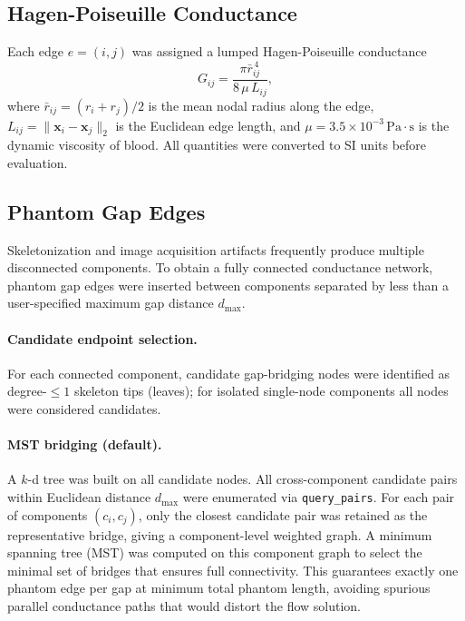 \documentclass[11pt]{article}
\begin{document}
\subsection{Hagen-Poiseuille Conductance}

Each edge $e = (i,j)$ was assigned a lumped Hagen-Poiseuille conductance
%
\begin{equation}
  G_{ij} = \frac{\pi \bar{r}_{ij}^{\,4}}{8\,\mu\,L_{ij}},
\end{equation}
%
where $\bar{r}_{ij} = (r_i + r_j)/2$ is the mean nodal radius along the
edge, $L_{ij} = \|\mathbf{x}_i - \mathbf{x}_j\|_2$ is the Euclidean edge
length, and $\mu = 3.5 \times 10^{-3}\,\mathrm{Pa\cdot s}$ is the dynamic
viscosity of blood.  All quantities were converted to SI units before evaluation.

\subsection{Phantom Gap Edges}

Skeletonization and image acquisition artifacts frequently produce multiple
disconnected components.  To obtain a fully connected conductance network,
phantom gap edges were inserted between components separated by less than a
user-specified maximum gap distance $d_\mathrm{max}$.

\paragraph{Candidate endpoint selection.}
For each connected component, candidate gap-bridging nodes were identified as
degree-$\leq 1$ skeleton tips (leaves); for isolated single-node components all
nodes were considered candidates.

\paragraph{MST bridging (default).}
A $k$-d tree was built on all candidate nodes.  All cross-component candidate
pairs within Euclidean distance $d_\mathrm{max}$ were enumerated via
\texttt{query\_pairs}.  For each pair of components $(c_i, c_j)$, only the
closest candidate pair was retained as the representative bridge, giving a
component-level weighted graph.  A minimum spanning tree (MST) was computed on
this component graph to select the minimal set of bridges that ensures full
connectivity.  This guarantees exactly one phantom edge per gap at minimum total
phantom length, avoiding spurious parallel conductance paths that would distort
the flow solution.
\end{document}
